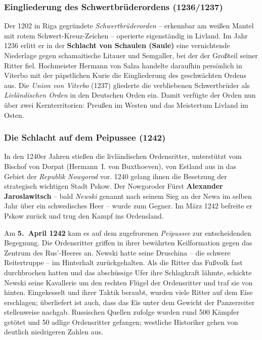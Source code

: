 \subsubsection{Eingliederung des Schwertbrüderordens (1236/1237)}\label{eingliederung_der_schwerbruder}

Der 1202 in Riga gegründete \textit{Schwertbrüderorden} -- erkennbar am weißen Mantel mit rotem Schwert-Kreuz-Zeichen -- operierte eigenständig in Livland. Im Jahr 1236 erlitt er in der \textbf{Schlacht von Schaulen (Saule)} eine vernichtende Niederlage gegen schamai\-tische Litauer und Semgaller, bei der der Großteil seiner Ritter fiel. Hochmeister Hermann von Salza handelte daraufhin persönlich in Viterbo mit der päpstlichen Kurie die Eingliederung des geschwächten Ordens aus. Die \textit{Union von Viterbo} (1237) gliederte die verbliebenen Schwertbrüder als \textit{Livländischen Orden} in den Deutschen Orden ein. Damit verfügte der Orden nun über zwei Kernterritorien: Preußen im Westen und das Meistertum Livland im Osten. \cite{benninghoven_schwertbrueder,selart_livland}

\subsubsection{Die Schlacht auf dem Peipussee (1242)}\label{niederlage_auf_dem_peipussee}

In den 1240er Jahren stießen die livländischen Ordensritter, unterstützt vom Bischof von Dorpat (Hermann~I. von Buxthoeven), von Estland aus in das Gebiet der \textit{Republik Nowgorod} vor. 1240 gelang ihnen die Besetzung der strategisch wichtigen Stadt Pskow. Der Nowgoroder Fürst \textbf{Alexander Jaroslawitsch} -- bald \textit{Newski} genannt nach seinem Sieg an der Newa im selben Jahr über ein schwedisches Heer -- wurde zum Gegner. Im März 1242 befreite er Pskow zurück und trug den Kampf ins Ordensland. \cite{selart_livland}

Am \textbf{5.~April 1242} kam es auf dem zugefrorenen \textit{Peipussee} zur entscheidenden Begegnung. Die Ordensritter griffen in ihrer bewährten Keilformation gegen das Zentrum des Rus'-Heeres an. Newski hatte seine Druschina -- die schwere Reitertruppe -- im Hinterhalt zurückgehalten. Als die Ritter das Fußvolk fast durchbrochen hatten und das abschüssige Ufer ihre Schlagkraft lähmte, schickte Newski seine Kavallerie um den rechten Flügel der Ordensritter und traf sie von hinten. Eingekesselt und ihrer Taktik beraubt, wurden viele Ritter auf dem Eise erschlagen; überliefert ist auch, dass das Eis unter dem Gewicht der Panzerreiter stellenweise nachgab. Russischen Quellen zufolge wurden rund 500 Kämpfer getötet und 50 adlige Ordensritter gefangen; westliche Historiker gehen von deutlich niedrigeren Zahlen aus. \cite{selart_livland,benninghoven_schwertbrueder}

